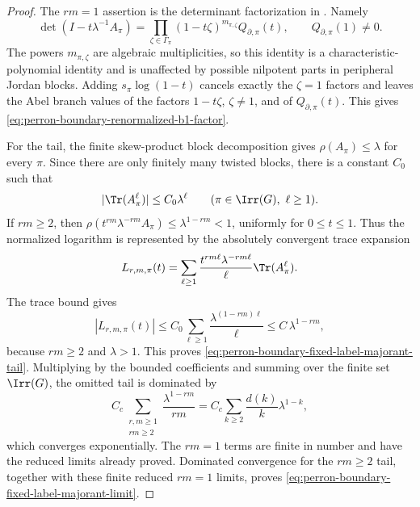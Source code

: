 \begin{proof}
  The \(rm=1\) assertion is the determinant factorization in
  .  Namely
  \[
    \det(I-t\lambda^{-1}A_\pi)
    =
    \prod_{\zeta\in\Gamma_\pi}(1-t\zeta)^{m_{\pi,\zeta}}
      Q_{\partial,\pi}(t),
    \qquad Q_{\partial,\pi}(1)\ne0 .
  \]
  The powers \(m_{\pi,\zeta}\) are algebraic multiplicities, so this identity
  is a characteristic-polynomial identity and is unaffected by possible
  nilpotent parts in peripheral Jordan blocks.  Adding \(s_\pi\log(1-t)\)
  cancels exactly the \(\zeta=1\) factors and leaves the Abel branch values
  of the factors \(1-t\zeta\), \(\zeta\ne1\), and of
  \(Q_{\partial,\pi}(t)\).  This gives
  \eqref{eq:perron-boundary-renormalized-b1-factor}.

  For the tail, the finite skew-product block decomposition gives
  \(\rho(A_\pi)\le\lambda\) for every \(\pi\).  Since there are only
  finitely many twisted blocks, there is a constant \(C_0\) such that
  \[
    |\Tr(A_\pi^\ell)|\le C_0\lambda^\ell
    \qquad(\pi\in\Irr(G),\ \ell\ge1).
  \]
  If \(rm\ge2\), then
  \(\rho(t^{rm}\lambda^{-rm}A_\pi)\le\lambda^{1-rm}<1\), uniformly for
  \(0\le t\le1\).  Thus the normalized logarithm is represented by the
  absolutely convergent trace expansion
  \[
    L_{r,m,\pi}(t)
    =
    \sum_{\ell\ge1}
      \frac{t^{rm\ell}\lambda^{-rm\ell}}{\ell}
      \Tr(A_\pi^\ell).
  \]
  The trace bound gives
  \[
    |L_{r,m,\pi}(t)|
    \le
    C_0\sum_{\ell\ge1}\frac{\lambda^{(1-rm)\ell}}{\ell}
    \le C\,\lambda^{1-rm},
  \]
  because \(rm\ge2\) and \(\lambda>1\).  This proves
  \eqref{eq:perron-boundary-fixed-label-majorant-tail}.  Multiplying by the
  bounded coefficients and summing over the finite set \(\Irr(G)\), the
  omitted tail is dominated by
  \[
    C_c
    \sum_{\substack{r,m\ge1\\rm\ge2}}\frac{\lambda^{1-rm}}{rm}
    =
    C_c
    \sum_{k\ge2}\frac{d(k)}{k}\lambda^{1-k},
  \]
  which converges exponentially.  The \(rm=1\) terms are finite in number and
  have the reduced limits already proved.  Dominated convergence for the
  \(rm\ge2\) tail, together with these finite reduced \(rm=1\) limits, proves
  \eqref{eq:perron-boundary-fixed-label-majorant-limit}.
\end{proof}

